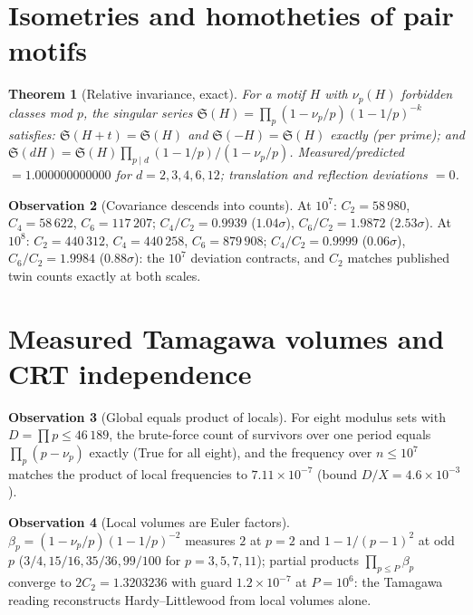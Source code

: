\documentclass[11pt,a4paper]{article}
\newtheorem{theorem}{Theorem}
\theoremstyle{definition}
\newtheorem{observation}[theorem]{Observation}
\begin{document}
\section{Isometries and homotheties of pair motifs}
\begin{theorem}[Relative invariance, exact]
For a motif $H$ with $\nu_p(H)$ forbidden classes mod $p$, the singular
series $\mathfrak S(H)=\prod_p (1-\nu_p/p)(1-1/p)^{-k}$ satisfies:
$\mathfrak S(H+t)=\mathfrak S(H)$ and $\mathfrak S(-H)=\mathfrak S(H)$ exactly
(per prime); and $\mathfrak S(dH)=\mathfrak S(H)\prod_{p\mid d}
(1-1/p)/(1-\nu_p/p)$. Measured/predicted $=1.000000000000$ for
$d=2,3,4,6,12$; translation and reflection deviations $=0$.
\end{theorem}
\begin{observation}[Covariance descends into counts]
At $10^7$: $C_2=58\,980$, $C_4=58\,622$, $C_6=117\,207$;
$C_4/C_2=0.9939$ ($1.04\sigma$), $C_6/C_2=1.9872$ ($2.53\sigma$).
At $10^8$: $C_2=440\,312$, $C_4=440\,258$, $C_6=879\,908$;
$C_4/C_2=0.9999$ ($0.06\sigma$), $C_6/C_2=1.9984$ ($0.88\sigma$): the
$10^7$ deviation contracts, and $C_2$ matches published twin counts exactly
at both scales.
\end{observation}

\section{Measured Tamagawa volumes and CRT independence}
\begin{observation}[Global equals product of locals]
For eight modulus sets with $D=\prod p\le46\,189$, the brute-force count of
survivors over one period equals $\prod_p(p-\nu_p)$ exactly (True for all
eight), and the frequency over $n\le10^7$ matches the product of local
frequencies to $7.11\times10^{-7}$ (bound $D/X=4.6\times10^{-3}$).
\end{observation}
\begin{observation}[Local volumes are Euler factors]
$\beta_p=(1-\nu_p/p)(1-1/p)^{-2}$ measures $2$ at $p=2$ and
$1-1/(p-1)^2$ at odd $p$ ($3/4,15/16,35/36,99/100$ for
$p=3,5,7,11$); partial products $\prod_{p\le P}\beta_p$ converge to
$2C_2=1.3203236$ with guard $1.2\times10^{-7}$ at $P=10^6$: the Tamagawa
reading reconstructs Hardy--Littlewood from local volumes alone.
\end{observation}
\end{document}
